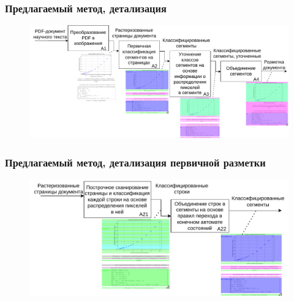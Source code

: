 \documentclass[gray]{beamer}
\begin{document}
\begin{frame}
    \frametitle{Предлагаемый метод, детализация}
    \begin{figure}[H]
        \begin{center}
            \includegraphics[width=\textwidth]{diag/a1-final.pdf}
        \end{center}
    \end{figure}
\end{frame}

\begin{frame}
    \frametitle{Предлагаемый метод, детализация первичной разметки}
    \begin{figure}[H]
        \begin{center}
            \includegraphics[width=\textwidth]{diag/a2-final.pdf}
        \end{center}
    \end{figure}
\end{frame}
\end{document}
